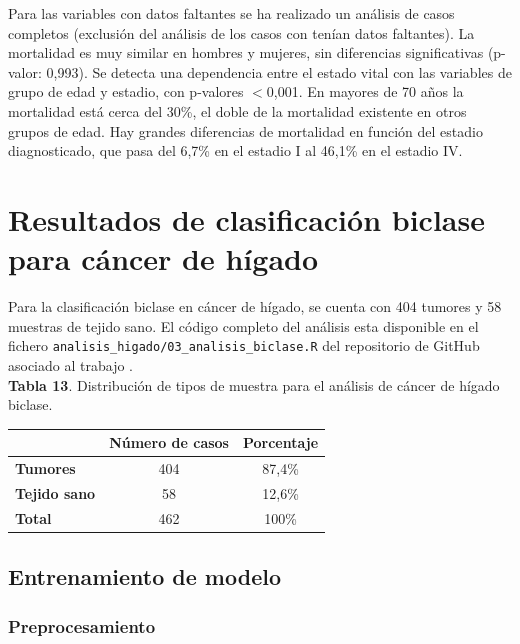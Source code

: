 Para las variables con datos faltantes se ha realizado un análisis de casos completos (exclusión del análisis de los casos con tenían datos faltantes).  La mortalidad es muy similar en hombres y mujeres, sin diferencias significativas (p-valor: 0,993). Se detecta una dependencia entre el estado vital con las variables de grupo de edad y estadio, con p-valores $<$0,001. En mayores de 70 años la mortalidad está cerca del 30\%, el doble de la mortalidad existente en otros grupos de edad. Hay grandes diferencias de mortalidad en función del estadio diagnosticado, que pasa del 6,7\% en el estadio I al 46,1\% en el estadio IV.

\section{Resultados de clasificación biclase para cáncer de hígado}

Para la clasificación biclase en cáncer de hígado, se cuenta con 404 tumores y 58 muestras de tejido sano. El código completo del análisis esta disponible en el fichero \texttt{analisis\_higado/03\_analisis\_biclase.R} del repositorio de GitHub asociado al trabajo \cite{Redondo-Sanchez2020}.\\

\textbf{Tabla 13}. Distribución de tipos de muestra para el análisis de cáncer de hígado biclase.

\begin{table}[H]
	\centering
	\begin{tabular}{lcc}
		\cline{2-3}
		& \textbf{Número de casos} & \textbf{Porcentaje} \\ \hline
		\textbf{Tumores}     & 404        & 87,4\%              \\
		\textbf{Tejido sano} & 58         & 12,6\%              \\ \hline
		\textbf{Total}       & 462        & 100\%               \\ \hline
	\end{tabular}
\end{table}

\subsection{Entrenamiento de modelo}

\subsubsection{Preprocesamiento}

